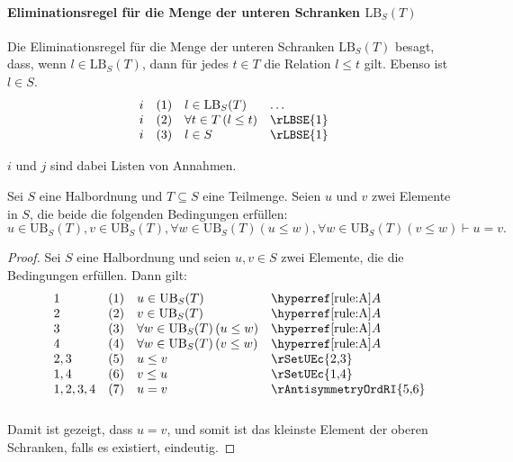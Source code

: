 \documentclass[main.tex]{subfiles}
\begin{document}
\paragraph{Eliminationsregel für die Menge der unteren Schranken \(\text{LB}_S(T)\)}
Die Eliminationsregel für die Menge der unteren Schranken \(\text{LB}_S(T)\) besagt, dass, wenn \(l \in \text{LB}_S(T)\), dann für jedes \(t \in T\) die Relation \(l \leq t\) gilt. Ebenso ist \(l \in S\).
\[
\begin{array}{llll}
    i & (1) & l \in \text{LB}_S(T) & \dots \\
    i & (2) & \forall t \in T \, (l \leq t) & \rLBSE{1} \\
    i & (3) & l \in S & \rLBSE{1}
\end{array}
\]

\(i\) und \(j\) sind dabei Listen von Annahmen.

\label{uInUBwvInUBwFawInUBLpuLeqwRpwFawInUBLpvLeqwRpImpuEqualsv}
\begin{theorem}
    Sei \( S \) eine Halbordnung und \( T \subseteq S \) eine Teilmenge. Seien \( u \) und \( v \) zwei Elemente in \( S \), die beide die folgenden Bedingungen erfüllen:
    \[
    u \in \text{UB}_S(T), v \in \text{UB}_S(T), \forall w \in \text{UB}_S(T) (u \leq w), \forall w \in \text{UB}_S(T) (v \leq w) \vdash u = v.
    \]
\end{theorem}

\begin{proof}
    Sei \( S \) eine Halbordnung und seien \( u, v \in S \) zwei Elemente, die die Bedingungen erfüllen. Dann gilt:
    \[
    \begin{array}{lll p{4cm}}
        1 & (1) & u \in \text{UB}_S(T) & \rA \\
        2 & (2) & v \in \text{UB}_S(T) & \rA \\
        3 & (3) & \forall w \in \text{UB}_S(T) \, (u \leq w) & \rA \\
        4 & (4) & \forall w \in \text{UB}_S(T) \, (v \leq w) & \rA \\
        2,3 & (5) & u \leq v & \rSetUEc{2,3}  \\
        1,4 & (6) & v \leq u & \rSetUEc{1,4} \\
        1,2,3,4 & (7) & u = v & \rAntisymmetryOrdRI{5,6} \\
    \end{array}
    \]
    Damit ist gezeigt, dass \( u = v \), und somit ist das kleinste Element der oberen Schranken, falls es existiert, eindeutig.
\end{proof}
\end{document}
